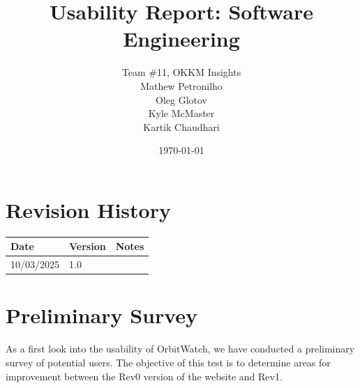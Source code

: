 \documentclass[12pt, titlepage]{article}
\begin{document}
\title{Usability Report: Software Engineering} 
\author{Team \#11, OKKM Insights\\
Mathew Petronilho\\
Oleg Glotov\\
Kyle McMaster\\
Kartik Chaudhari}
\date{\today}
	
\maketitle


\section{Revision History}

\begin{tabularx}{\textwidth}{p{3cm}p{2cm}X}
\toprule {\bf Date} & {\bf Version} & {\bf Notes}\\
\midrule
10/03/2025 & 1.0 &\\
\bottomrule
\end{tabularx}


\tableofcontents

\section{Preliminary Survey}
As a first look into the usability of OrbitWatch, we have conducted a preliminary survey of potential users. The objective of this test is to determine areas for improvement between the Rev0 version of the website and Rev1.
\end{document}
